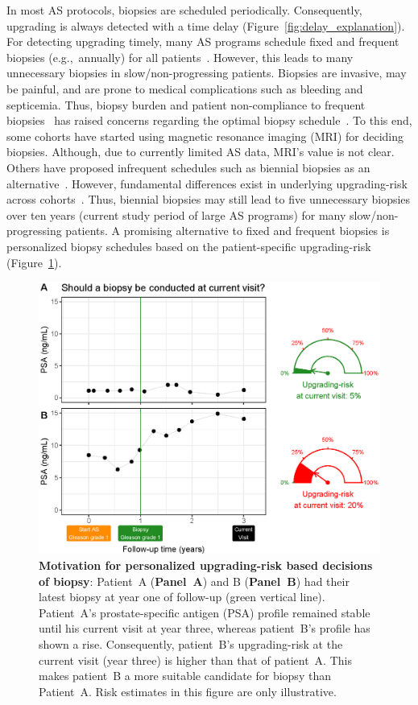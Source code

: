 In most AS protocols, biopsies are scheduled periodically. Consequently, upgrading is always detected with a time delay (Figure~\ref{fig:delay_explanation}). For detecting upgrading timely, many AS programs schedule fixed and frequent biopsies (e.g.,~annually) for all patients~\citep{nieboer2018active,loeb2014heterogeneity}. However, this leads to many unnecessary biopsies in slow/non-progressing patients. Biopsies are invasive, may be painful, and are prone to medical complications such as bleeding and septicemia\citep{loeb2013systematic}. Thus, biopsy burden and patient non-compliance to frequent biopsies~\citep{bokhorst2015compliance} has raised concerns regarding the optimal biopsy schedule~\citep{inoue2018comparative, bratt2013study}. To this end, some cohorts have started using magnetic resonance imaging (MRI) for deciding biopsies. Although, due to currently limited AS data, MRI's value is not clear. Others have proposed infrequent schedules such as biennial biopsies as an alternative~\citep{inoue2018comparative,de2017estimating}. However, fundamental differences exist in underlying upgrading-risk across cohorts~\citep{inoue2018comparative}. Thus, biennial biopsies may still lead to five unnecessary biopsies over ten years (current study period of large AS programs) for many slow/non-progressing patients. A promising alternative to fixed and frequent biopsies is personalized biopsy schedules based on the patient-specific upgrading-risk (Figure~\ref{fig:riskBasedExample}).

\begin{figure}
\centerline{\includegraphics[width=\columnwidth]{images/riskBasedExample.eps}}
\caption{\textbf{Motivation for personalized upgrading-risk based decisions of biopsy}: Patient~A (\textbf{Panel~A}) and B (\textbf{Panel~B}) had their latest biopsy at year one of follow-up (green vertical line). Patient~A's prostate-specific antigen (PSA) profile remained stable until his current visit at year three, whereas patient~B's profile has shown a rise. Consequently, patient~B's upgrading-risk at the current visit (year three) is higher than that of patient~A. This makes patient~B a more suitable candidate for biopsy than Patient~A. Risk estimates in this figure are only illustrative.}
\label{fig:riskBasedExample}
\end{figure}

